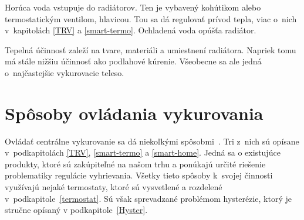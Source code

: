 Horúca voda vstupuje do radiátorov. 
Ten je vybavený kohútikom alebo termostatickým ventilom, hlavicou. 
Tou sa dá regulovať prívod tepla, viac o~nich v~kapitolách \ref{TRV} a \ref{smart-termo}. 
Ochladená voda opúšťa radiátor.

Tepelná účinnosť zaleží na tvare, materiáli a umiestnení radiátora. 
Napriek tomu má stále nižšiu účinnosť ako podlahové kúrenie. Všeobecne sa ale jedná o~najčastejšie vykurovacie teleso.


\section{Spôsoby ovládania vykurovania}\label{solutions}
Ovládať centrálne vykurovanie sa dá niekoľkými spôsobmi~\cite{hometree_2022}. Tri z~nich sú opísane v~podkapitolách \ref{TRV}, \ref{smart-termo} a \ref{smart-home}.
Jedná sa o existujúce produkty, ktoré sú zakúpiteľné na našom trhu a ponúkajú určité riešenie problematiky regulácie vyhrievania. 
Všetky tieto spôsoby k~svojej činnosti využívajú nejaké termostaty, ktoré sú vysvetlené a rozdelené v~podkapitole~\ref{termostat}.
Sú však sprevadzané problémom hysterézie, ktorý je stručne opísaný v podkapitole~\ref{Hyster}.

